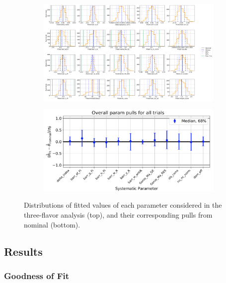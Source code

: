 \begin{figure} 
    \centering
    \begin{subfigure}[t]{0.99\textwidth}
        \centering
        \includegraphics[width=0.99\textwidth]{figures/measurement/three_flavor/ensemble_pre_fit/ensemble_fitdist.png}
    \end{subfigure}
    \begin{subfigure}[t]{0.65\textwidth}
        \centering
        \includegraphics[width=0.99\textwidth]{figures/measurement/three_flavor/ensemble_pre_fit/ensemble_pull.png}  
    \end{subfigure}
  \caption{Distributions of fitted values of each parameter considered in the three-flavor analysis (top), and their corresponding pulls from nominal (bottom).
  \label{fig:three-flavor-ensemble-param}}
\end{figure}

\subsection{Results}

\subsubsection{Goodness of Fit}

